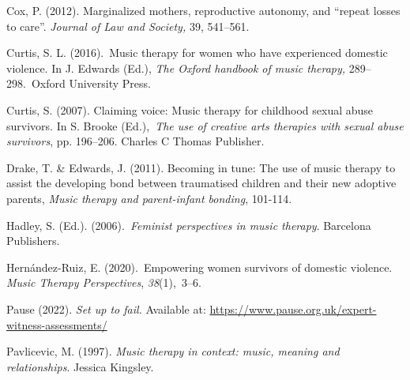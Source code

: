 \documentclass[authordate, empirical]{jote-new-article}
\begin{document}
	Cox, P. (2012). Marginalized mothers, reproductive autonomy, and “repeat losses to care”. \emph{Journal of Law and Society,} 39, 541--561.







	Curtis, S. L. (2016). Music therapy for women who have experienced domestic violence. In J. Edwards (Ed.), \emph{The Oxford handbook of music therapy,} 289--298. Oxford University Press.







	Curtis, S. (2007). Claiming voice: Music therapy for childhood sexual abuse survivors. In S. Brooke (Ed.), \emph{The use of creative arts therapies with sexual abuse survivors}, pp. 196--206. Charles C Thomas Publisher.







	Drake, T. \& Edwards, J. (2011). Becoming in tune: The use of music therapy to assist the developing bond between traumatised children and their new adoptive parents, \emph{Music therapy and parent-infant bonding}, 101-114.







	Hadley, S. (Ed.). (2006). \emph{Feminist perspectives in music therapy}. Barcelona Publishers.







	Hernández-Ruiz, E. (2020). Empowering women survivors of domestic violence. \emph{Music Therapy Perspectives}, \emph{38}(1), 3--6.







	Pause (2022). \emph{Set up to fail. }Available at: \href{https://www.pause.org.uk/expert-witness-assessments/}{https://www.pause.org.uk/expert-witness-assessments/}







	Pavlicevic, M. (1997). \emph{Music therapy in context: music, meaning and relationships}. Jessica Kingsley.
\end{document}
